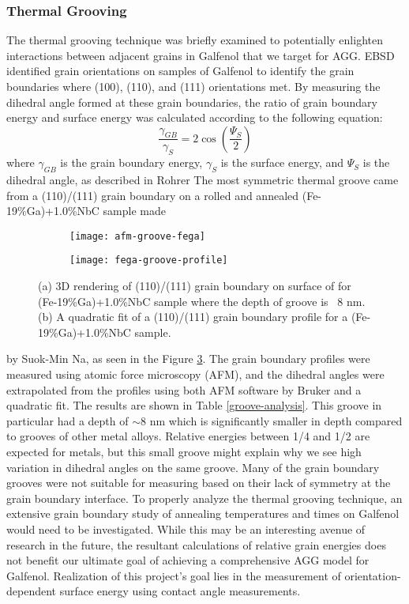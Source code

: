 \subsubsection{Thermal Grooving}

The thermal grooving technique was briefly examined to potentially enlighten interactions between adjacent grains in Galfenol that we target for AGG. EBSD identified grain orientations on samples of Galfenol to identify the grain boundaries where \hkl(100), \hkl(110), and \hkl(111) orientations met. By measuring the dihedral angle formed at these grain boundaries, the ratio of grain boundary energy and surface energy was calculated according to the following equation: 
\begin{equation}
\frac{\gamma_{GB}}{\gamma_{S}} = 2\cos\left(\frac{\Psi_{S}}{2}\right) 
\end{equation}
where $\gamma_{GB}$ is the grain boundary energy, $\gamma_{S}  $ is the surface energy, and $\Psi_{S} $ is the dihedral angle, as described in Rohrer \etal\cite{Rohrer2010a} The most symmetric thermal groove came from a \hkl(110)/\hkl(111) grain boundary on a rolled and annealed (Fe-19\%Ga)+1.0\%NbC sample made 
\begin{figure}[h!]
	\centering
	\begin{subfigure}[c]{0.45\textwidth}
		\texttt{[image: afm-groove-fega]}
		\subcaption{~}
		\label{fig:afm-groove-fega}		
	\end{subfigure}
	\begin{subfigure}[c]{0.45\textwidth} 
		\texttt{[image: fega-groove-profile]}
		\subcaption{~}
		\label{fig:fega-groove-profile}		
	\end{subfigure}
	\caption{(a) 3D rendering of (110)/(111) grain boundary on surface of  for (Fe-19\%Ga)+1.0\%NbC sample where the depth of groove is ~8 nm. (b) A quadratic fit of a (110)/(111) grain boundary profile for a (Fe-19\%Ga)+1.0\%NbC sample.}
	\label{fig:thermal-groove}
\end{figure}
by Suok-Min Na, as seen in the Figure \ref{fig:thermal-groove}.  The grain boundary profiles were measured using atomic force microscopy (AFM), and the dihedral angles were extrapolated from the profiles using both AFM software by Bruker and a quadratic fit.  The results are shown in Table \ref{groove-analysis}. This groove in particular had a depth of $\sim$8 nm which is significantly smaller in depth compared to grooves of other metal alloys.\cite{Skidmore2004a} Relative energies between 1/4 and 1/2 are expected for metals, but this small groove might explain why we see high variation in dihedral angles on the same groove. Many of the grain boundary grooves were not suitable for measuring based on their lack of symmetry at the grain boundary interface. To properly analyze the thermal grooving technique, an extensive grain boundary study of annealing temperatures and times on Galfenol would need to be investigated. While this may be an interesting avenue of research in the future, the resultant calculations of relative grain energies does not benefit our ultimate goal of achieving a comprehensive AGG model for Galfenol. Realization of this project's goal lies in the measurement of orientation-dependent surface energy using contact angle measurements. 


